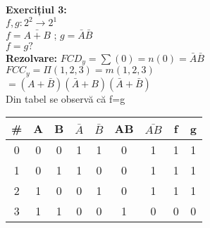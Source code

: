 \documentclass[12pt]{article}
\begin{document}
\begin{figure}[h!]
    \begin{minipage}{0.6\textwidth}
        \textbf{Exercițiul 3:\\}
        $f,g:2^2\rightarrow2^1$\\
        $f=\bar{A+B}$ ; $g=\bar{A}\bar{B}$\\
        $f=g?$\\
        \textbf{Rezolvare:}
        $FCD_{y}=\sum(0)=n(0)=\bar{A}\bar{B}$\\
        $FCC_{y}=\Pi(1,2,3)=m(1,2,3)$\\
        $=(A+\bar{B})(\bar{A}+B)(\bar{A}+\bar{B})$\\
        Din tabel se observă că f=g\\
    \end{minipage}
    \hfill
    \begin{minipage}{0.4\textwidth}
        \begin{tabular}{|c|c|c|c|c|c|c|c|c|}
            \hline
            \# & A & B & $\bar{A}$ & $\bar{B}$ & AB & $\bar{AB}$ & f & g \\ \hline
            0 & 0 & 0 & 1 & 1 & 0 & 1 & 1 & 1\\ \hline
            1 & 0 & 1 & 1 & 0 & 0 & 1 & 1 & 1\\ \hline
            2 & 1 & 0 & 0 & 1 & 0 & 1 & 1 & 1\\ \hline
            3 & 1 & 1 & 0 & 0 & 1 & 0 & 0 & 0\\ \hline
        \end{tabular}
    \end{minipage}
\end{figure}
\end{document}
